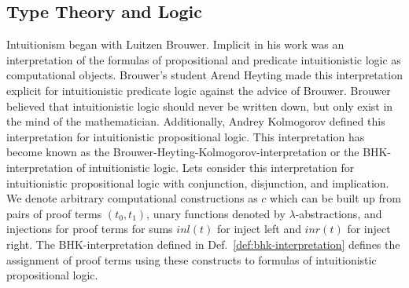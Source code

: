 \documentclass{article}
\begin{document}
\subsection{Type Theory and Logic}
\label{subsec:type_theory_logic}
Intuitionism began with Luitzen Brouwer.  Implicit in his work was an
interpretation of the formulas of propositional and predicate
intuitionistic logic as computational objects.  Brouwer's student
Arend Heyting made this interpretation explicit for intuitionistic
predicate logic against the advice of Brouwer.  Brouwer believed that
intuitionistic logic should never be written down, but only exist in
the mind of the mathematician.  Additionally, Andrey Kolmogorov
defined this interpretation for intuitionistic propositional logic.
This interpretation has become known as the
Brouwer-Heyting-Kolmogorov-interpretation or the BHK-interpretation of
intuitionistic logic.  Lets consider this interpretation for
intuitionistic propositional logic with conjunction, disjunction, and
implication.  We denote arbitrary computational constructions as $c$
which can be built up from pairs of proof terms $(t_0,t_1)$, unary
functions denoted by $\lambda$-abstractions, and injections for proof
terms for sums $inl(t)$ for inject left and $inr(t)$ for inject right.
The BHK-interpretation defined in Def.~\ref{def:bhk-interpretation}
defines the assignment of proof terms using these constructs to
formulas of intuitionistic propositional logic.
\end{document}
